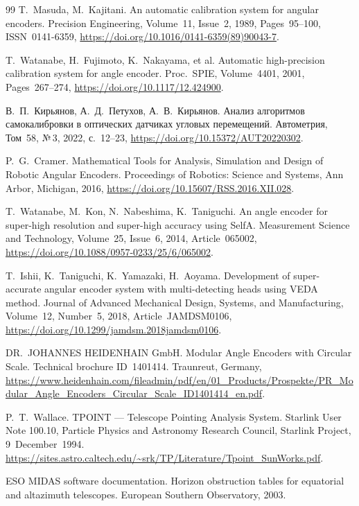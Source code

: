 \documentclass[14pt,a4paper]{extarticle}
\begin{document}
\begin{thebibliography}{99}
T.~Masuda, M.~Kajitani.
An automatic calibration system for angular encoders.
Precision Engineering,
Volume~11, Issue~2,
1989,
Pages~95--100,
ISSN~0141-6359,
\url{https://doi.org/10.1016/0141-6359(89)90043-7}.

T.~Watanabe, H.~Fujimoto, K.~Nakayama, et al.
Automatic high-precision calibration system for angle encoder.
Proc.\ SPIE,
Volume~4401,
2001,
Pages~267--274,
\url{https://doi.org/10.1117/12.424900}.

В.~П.~Кирьянов, А.~Д.~Петухов, А.~В.~Кирьянов.
Анализ алгоритмов самокалибровки в оптических датчиках угловых перемещений.
Автометрия,
Том~58, №\,3,
2022,
с.~12--23,
\url{https://doi.org/10.15372/AUT20220302}.

P.~G.~Cramer.
Mathematical Tools for Analysis, Simulation and Design of Robotic Angular Encoders.
Proceedings of Robotics: Science and Systems,
Ann Arbor, Michigan,
2016,
\url{https://doi.org/10.15607/RSS.2016.XII.028}.

T.~Watanabe, M.~Kon, N.~Nabeshima, K.~Taniguchi.
An angle encoder for super-high resolution and super-high accuracy using SelfA.
Measurement Science and Technology,
Volume~25, Issue~6,
2014,
Article~065002,
\url{https://doi.org/10.1088/0957-0233/25/6/065002}.

T.~Ishii, K.~Taniguchi, K.~Yamazaki, H.~Aoyama.
Development of super-accurate angular encoder system with multi-detecting heads using VEDA method.
Journal of Advanced Mechanical Design, Systems, and Manufacturing,
Volume~12, Number~5,
2018,
Article~JAMDSM0106,
\url{https://doi.org/10.1299/jamdsm.2018jamdsm0106}.

DR.~JOHANNES HEIDENHAIN GmbH.
Modular Angle Encoders with Circular Scale.
Technical brochure ID~1401414.
Traunreut, Germany,
\url{https://www.heidenhain.com/fileadmin/pdf/en/01_Products/Prospekte/PR_Modular_Angle_Encoders_Circular_Scale_ID1401414_en.pdf}.

P.~T.~Wallace.
TPOINT — Telescope Pointing Analysis System.
Starlink User Note 100.10,
Particle Physics and Astronomy Research Council,
Starlink Project,
9~December~1994.
\url{https://sites.astro.caltech.edu/~srk/TP/Literature/Tpoint_SunWorks.pdf}.

ESO MIDAS software documentation.
Horizon obstruction tables for equatorial and altazimuth telescopes.
European Southern Observatory, 2003.


\end{thebibliography}
\end{document}
